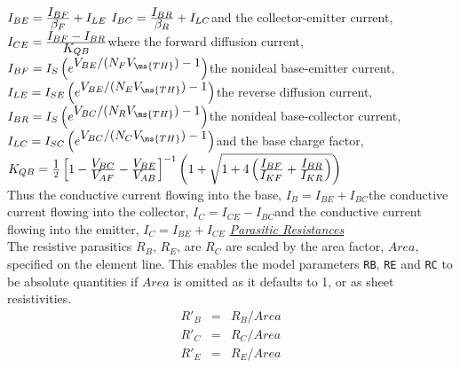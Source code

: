  $I_{BE} = {{\textstyle
I_{BF} } \over {\textstyle \beta_F }} + I_{LE}$\inlineeq
{} $I_{BC} = {{\textstyle
I_{BR} } \over {\textstyle \beta_R }} + I_{LC}$\inlineeq and the
collector-emitter current, $I_{CE} = {{\textstyle I_{BF} - I_{BR}
} \over {\textstyle K_{QB} }}$\inlineeq where the forward
diffusion current, $I_{BF} = I_S\left(e^{\textstyle V_{BE}/(N_F
V_{\ms{TH}}) - 1} \right)$\inlineeq the nonideal base-emitter
current, $I_{LE}=I_{SE}\left(e^{\textstyle V_{BE}/(N_E
V_{\ms{TH}}) - 1} \right)$\inlineeq the reverse diffusion current,
$I_{BR} = I_S\left(e^{\textstyle V_{BC}/(N_R V_{\ms{TH}}) - 1}
\right)$\inlineeq the nonideal base-collector current,
$I_{LC}=I_{SC}\left(e^{\textstyle V_{BC}/(N_C V_{\ms{TH}}) - 1}
\right)$\inlineeq and the base charge factor, $K_{QB} =
{{\textstyle 1}\over{2}} \left[1 -
    {{\textstyle V_{BC}}\over{\textstyle V_{AF}}}-
         {{\textstyle V_{BE}}\over{\textstyle V_{AB}}}
    \right]^{-1} \left(1 + \sqrt{1 + 4\left(
        {{\textstyle I_{BF}}\over{\textstyle I_{KF}}}+
         {{\textstyle I_{BR}}\over{\textstyle I_{KR}}}
        \right)}\right)$\\\inlineeq
Thus the conductive current flowing into the base, $I_B =
I_{BE}+I_{BC}$\inlineeq the conductive current flowing into the
collector, $I_C = I_{CE}-I_{BC}$\inlineeq and the conductive
current flowing into the emitter, $I_C = I_{BE}+I_{CE}$\inlineeq
\vspace{0.1in}
\noindent\underline{\sl \large Parasitic Resistances}\\[0.1in]
     The resistive parasitics $R_B$, $R_E$, are $R_C$ are scaled
by the area factor, $Area$, specified on the element line. This
enables the model parameters {\tt RB}, {\tt RE} and {\tt RC} to be
absolute quantities if $Area$ is omitted as it defaults to 1, or
as sheet resistivities.
\begin{eqnarray}
R'_B & = & R_B/Area\\
R'_C & = & R_C/Area\\
R'_E & = & R_E/Area
\end{eqnarray}

